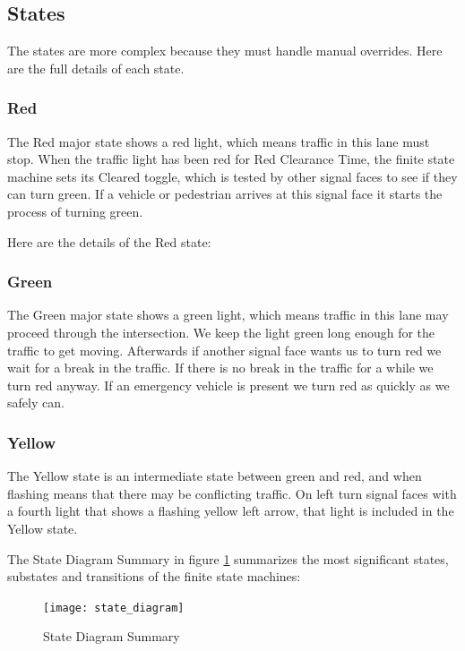 \documentclass[letterpaper,twoside]{article}
\begin{document}
\subsection{States}

The states are more complex because they must handle
manual overrides.  Here are the full details of each state.

\subsubsection{Red}
The Red major state shows a red light, which means traffic in this
lane must stop.  When the traffic light has been red for Red Clearance Time,
the finite state machine sets its Cleared toggle, which is tested by other
signal faces to see if they can turn green.  If a vehicle or
pedestrian arrives at this signal face it starts the process
of turning green.

Here are the details of the Red state:
      


\subsubsection{Green}
The Green major state shows a green light, which means traffic in this lane
may proceed through the intersection.  We keep the light green long enough
for the traffic to get moving.  Afterwards if another signal face wants us
to turn red we wait for a break in the traffic.  If there is no break in the
traffic for a while we turn red anyway.  If an emergency vehicle is present
we turn red as quickly as we safely can.



\subsubsection{Yellow}
The Yellow state is an intermediate state between green and red, and when
flashing means that there may be conflicting traffic.  On left turn signal
faces with a fourth light that shows a flashing yellow left arrow, that
light is included in the Yellow state.



The State Diagram Summary in figure \ref{fig:State_Diagram_Summary}
summarizes the most significant states, substates and
transitions of the finite state machines:

\begin{figure}[htb]
  {\texttt{[image: state\_diagram]}}
  {\caption{State Diagram Summary}\label{fig:State_Diagram_Summary}}
\end{figure}
\end{document}
